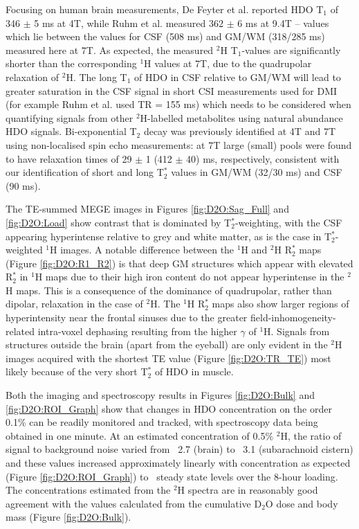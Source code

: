 \documentclass[class=article, crop=false]{standalone}
\begin{document}
Focusing on human brain measurements, De Feyter et al.\cite{DeFeyter2018DeuteriumVivo} reported HDO T$_1$ of 346 $\pm$ 5 ms at 4T, while Ruhm et al.\cite{Ruhm2021DeuteriumResolution} measured 362 $\pm$ 6 ms at 9.4T – values which lie between the values for CSF (508 ms) and GM/WM (318/285 ms) measured here at 7T. As expected, the measured $^2$H T$_1$-values are significantly shorter than the corresponding $^1$H values at 7T\cite{Peters2007T27T}, due to the quadrupolar relaxation of $^2$H. The long T$_1$ of HDO in CSF relative to GM/WM will lead to greater saturation in the CSF signal in short CSI measurements used for DMI (for example Ruhm et al. used TR = 155 ms\cite{Ruhm2021DeuteriumResolution}) which needs to be considered when quantifying signals from other $^2$H-labelled metabolites using natural abundance HDO signals. Bi-exponential T$_2$ decay was previously identified at 4T\cite{DeFeyter2018DeuteriumVivo} and 7T\cite{Roig2022Deuterium7T} using non-localised spin echo measurements: at 7T  large (small) pools were found to have relaxation times of 29 $\pm$ 1 (412 $\pm$ 40) ms, respectively\cite{Roig2022Deuterium7T}, consistent with our identification of short and long T$_2^*$ values in GM/WM (32/30 ms) and CSF (90 ms). 

The TE-summed MEGE images in Figures \ref{fig:D2O:Sag_Full} and \ref{fig:D2O:Load} show contrast that is dominated by T$_2^*$-weighting, with the CSF appearing hyperintense relative to grey and white matter, as is the case in T$_2^*$-weighted $^1$H images. A notable difference between the $^1$H and $^2$H R$_2^*$ maps (Figure \ref{fig:D2O:R1_R2}) is that deep GM structures which appear with elevated R$_2^*$ in $^1$H maps due to their high iron content\cite{Peters2007T27T} do not appear hyperintense in the $^2$H maps. This is a consequence of the dominance of quadrupolar, rather than dipolar, relaxation in the case of $^2$H. The $^1$H R$_2^*$ maps also show larger regions of hyperintensity near the frontal sinuses due to the greater field-inhomogeneity-related intra-voxel dephasing resulting from the higher $\gamma$ of $^1$H. Signals from structures outside the brain (apart from the eyeball) are only evident in the $^2$H images acquired with the shortest TE value (Figure \ref{fig:D2O:TR_TE}) most likely because of the very short T$_2^*$ of HDO in muscle\cite{Gursan2022ResidualMuscle,Damion2021NaturalT}.

Both the imaging and spectroscopy results in Figures \ref{fig:D2O:Bulk} and \ref{fig:D2O:ROI_Graph} show that changes in HDO concentration on the order 0.1\% can be readily monitored and tracked, with spectroscopy data being obtained in one minute. At an estimated concentration of 0.5\% $^2$H, the ratio of signal to background noise varied from ~2.7 (brain) to ~3.1 (subarachnoid cistern) and these values increased approximately linearly with concentration as expected (Figure \ref{fig:D2O:ROI_Graph}) to ~steady state levels over the 8-hour loading. The concentrations estimated from the $^2$H spectra are in reasonably good agreement with the values calculated from the cumulative D$_2$O dose and body mass (Figure \ref{fig:D2O:Bulk}). 
\end{document}
